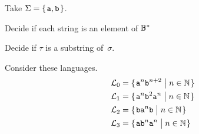 \documentclass[noanswers, nolegalese, 11pt]{examjh}
\begin{document}
\thispagestyle{empty}
\vspace{-1ex}
\makebox[\textwidth]{\hbox{}\hrulefill\hbox{}}


\begin{questions}
\question
Take $\Sigma=\set{\str{a},\str{b}}$.

\question
Decide if each string is an element of ${{\mathbb{B}}^{*}}$

\question
Decide if $\tau$ is a substring of~$\sigma$.

\question
Consider these languages.
\begin{align*}
  &\lang_0=\set{\str{a}^n\str{b}^{n+2}\suchthat n\in\N}   \\
  &\lang_1=\set{\str{a}^n\str{b}^{2}\str{a}^n\suchthat n\in\N}  \\
  &\lang_2=\set{\str{b}\str{a}^n\str{b}\suchthat n\in\N}   \\
  &\lang_3=\set{\str{a}\str{b}^{n}\str{a}^n\suchthat n\in\N}  
\end{align*}
\begin{parts}

\end{parts}
\end{questions}
\end{document}

